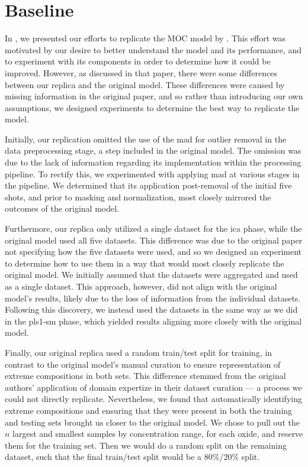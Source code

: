 \section{Baseline}
In \citet{p9_paper}, we presented our efforts to replicate the MOC model by \citet{cleggRecalibrationMarsScience2017}.
This effort was motivated by our desire to better understand the model and its performance, and to experiment with its components in order to determine how it could be improved.
However, as discussed in that paper, there were some differences between our replica and the original model.
These differences were caused by missing information in the original paper, and so rather than introducing our own assumptions, we designed experiments to determine the best way to replicate the model.

Initially, our replication omitted the use of the \gls{mad} for outlier removal in the data preprocessing stage, a step included in the original model.
The omission was due to the lack of information regarding its implementation within the processing pipeline.
To rectify this, we experimented with applying \gls{mad} at various stages in the pipeline.
We determined that its application post-removal of the initial five shots, and prior to masking and normalization, most closely mirrored the outcomes of the original model.

Furthermore, our replica only utilized a single dataset for the \gls{ica} phase, while the original model used all five datasets.
This difference was due to the original paper not specifying how the five datasets were used, and so we designed an experiment to determine how to use them in a way that would most closely replicate the original model.
We initially assumed that the datasets were aggregated and used as a single dataset.
This approach, however, did not align with the original model's results, likely due to the loss of information from the individual datasets.
Following this discovery, we instead used the datasets in the same way as we did in the \gls{pls1-sm} phase, which yielded results aligning more closely with the original model.

Finally, our original replica used a random train/test split for training, in contrast to the original model's manual curation to ensure representation of extreme compositions in both sets.
This difference stemmed from the original authors' application of domain expertize in their dataset curation --- a process we could not directly replicate.
Nevertheless, we found that automatically identifying extreme compositions and ensuring that they were present in both the training and testing sets brought us closer to the original model.
We chose to pull out the $n$ largest and smallest samples by concentration range, for each oxide, and reserve them for the training set.
Then we would do a random split on the remaining dataset, such that the final train/test split would be a $80\%/20\%$ split.

